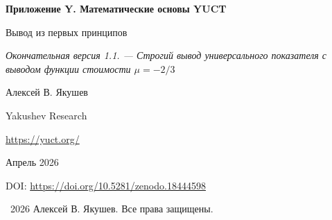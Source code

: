 \documentclass[11pt,a4paper]{article}
\begin{document}
	
	\begin{titlepage}
		\centering
		\vspace*{0cm}
		
		{\Huge\bfseries Приложение Y. Математические основы YUCT\par}
		\vspace{0.3cm}
		{\Large Вывод из первых принципов\par}
		\vspace{0.3cm}
		{\large \textit{Окончательная версия 1.1. — Строгий вывод универсального показателя с выводом функции стоимости 
				\(\mu = -2/3\)}\par}
		\vspace{1.5cm}
		
		{\large Алексей В. Якушев\par}
		\vspace{0.3cm}
		{\normalsize Yakushev Research\par}
		{\normalsize \url{https://yuct.org/}\par}
		
		\vspace{0.5cm}
		{\normalsize Апрель 2026\par}
		\vspace{0.3cm}
		{\normalsize DOI: \url{https://doi.org/10.5281/zenodo.18444598}\par}
		
		\vfill
		
		\begin{abstract}
			\noindent
			В данном документе представлены математические основы теории объединённой координации Якушева (YUCT) в строгой и самосогласованной форме. Исходя из определения координационных кластеров и параметра эффективности \(K_{\mathrm{eff}}\), мы строим микроскопическую модель координационной сети. Из трёх фундаментальных аксиом — иерархическая масштабная инвариантность, бинарная полнота словаря и трёхмерное вложение — мы определяем распределение энтропии по уровням. Добавляя четвёртую аксиому макроскопической масштабной инвариантности и явную функцию стоимости для доставки индекса, мы выводим универсальный закон ошибок \(\varepsilon \propto K_{\mathrm{eff}}^{-\beta}\) с \(\beta = 2/3\) как теорему. Эффективное скалярно-тензорное действие для поля координации, модифицированные уравнения Эйнштейна, топологическое происхождение космологической постоянной и иерархия масс фермионов затем вводятся как следствия или гипотезы, основанные на основной теореме. Все утверждения явно помечены как Аксиома, Теорема, Гипотеза, Предположение или Феноменологический закон. Теория даёт конкретные, опровергаемые предсказания, включая температурно-зависимую гравитационную постоянную. Новый раздел связывает универсальный закон ошибок с асимптотическим распределением простых чисел (Теорема~4 основного текста), показывая, что тот же показатель \(\beta = 2/3\) управляет флуктуациями простых чисел.
		\end{abstract}
		
		\vspace{0.5cm}
		\textcopyright\ 2026 Алексей В. Якушев. Все права защищены.
	\end{titlepage}
	
\end{document}
